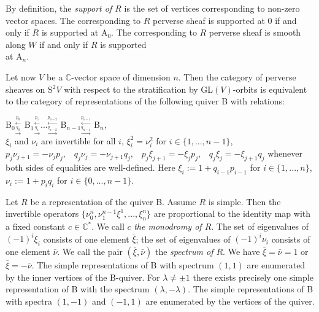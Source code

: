 \documentclass[12pt]{amsart}
\theoremstyle{definition}\newtheorem{theorem}{Theorem}[section]
\theoremstyle{definition}\newtheorem{definition}[proposition]{Definition}
\theoremstyle{remark}\newtheorem{example}[proposition]{Example}
\begin{document}
By definition, the {\it support of $R$} is the set of vertices corresponding to non-zero vector spaces. The corresponding to $R$ perverse sheaf is supported at 0 if and only if $R$ is supported at A$_0$. The corresponding to $R$ perverse sheaf is smooth along $W$ if and only if $R$ is supported \\at A$_n$.

Let now $V$ be a $\mathbb C$-vector space of dimension $n$. Then the
category of perverse sheaves on S$^2V$ with respect to the
stratification by GL$(V)$-orbits is equivalent to the category of
representations of the following quiver B with
relations:\begin{center}{\Large
B$_0$}$_{\xrightarrow{q_0}}^{\xleftarrow{p_0}}${\Large
B$_1$}$_{\xrightarrow{q_1}}^{\xleftarrow{p_1}}$...$_{\xrightarrow{q_{n-2}}}^{\xleftarrow{p_{n-2}}}${\Large
B$_{n-1}$}$_{\xrightarrow{q_{n-1}}}^{\xleftarrow{p_{n-1}}}${\Large
B$_n$},\\ $\xi_i$ and $\nu_i$ are invertible for all $i$,
$\xi_i^2=\nu_i^2$ for $i\in\{1,..., n-1\}$, $p_j\nu_{j+1}=-\nu_j
p_j,\hspace{10pt} q_j\nu_j=-\nu_{j+1} q_j,\hspace{10pt}
p_j\xi_{j+1}=-\xi_j p_j,\hspace{10pt} q_j\xi_j=-\xi_{j+1} q_j$
whenever both sides of equalities are well-defined. Here
$\xi_i:=1+q_{i-1}p_{i-1}$ for $i\in\{1,..., n\}$, $\nu_i:=1+p_iq_i$
for $i\in\{0,..., n-1\}$.\end{center} Let $R$ be a representation of
the quiver B.  Assume $R$ is simple. Then the invertible operators
$\{\nu_0^n, \nu_1^{n-1}\xi^1,..., \xi_n^n\}$ are proportional to the
identity map with a fixed constant $c\in\mathbb C^*$. We call $c$
{\it the monodromy of $R$}. The set of eigenvalues of $(-1)^i\xi_i$
consists of one element $\bar\xi$; the set of eigenvalues of
$(-1)^i\nu_i$ consists of one element $\bar\nu$.  We call the pair
$(\bar\xi, \bar\nu)$ the {\it spectrum of $R$}. We have
$\bar\xi=\bar\nu=1$ or $\bar\xi=-\bar\nu$. The simple
representations of B with spectrum $(1, 1)$ are enumerated by the
inner vertices of the B-quiver. For $\lambda\ne\pm1$ there exists
precisely one simple representation of B with the spectrum
$(\lambda, -\lambda)$. The simple representations of B with spectra
$(1, -1)$ and $(-1, 1)$ are enumerated by the vertices of the
quiver.
\end{document}
